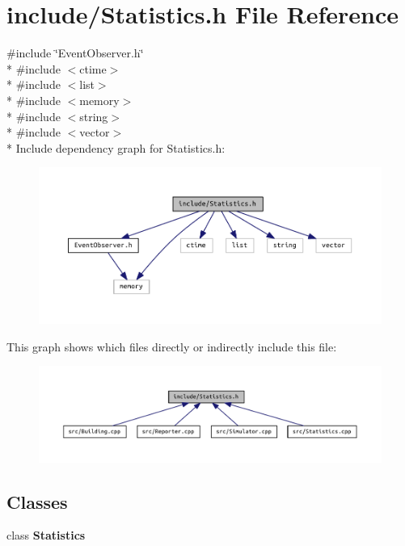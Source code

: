 \section{include/\+Statistics.h File Reference}
\label{_statistics_8h}
{\ttfamily \#include \char`\"{}Event\+Observer.\+h\char`\"{}}\\*
{\ttfamily \#include $<$ctime$>$}\\*
{\ttfamily \#include $<$list$>$}\\*
{\ttfamily \#include $<$memory$>$}\\*
{\ttfamily \#include $<$string$>$}\\*
{\ttfamily \#include $<$vector$>$}\\*
Include dependency graph for Statistics.\+h\+:
\nopagebreak
\begin{figure}[H]
\begin{center}
\leavevmode
\includegraphics[width=350pt]{_statistics_8h__incl}
\end{center}
\end{figure}
This graph shows which files directly or indirectly include this file\+:
\nopagebreak
\begin{figure}[H]
\begin{center}
\leavevmode
\includegraphics[width=350pt]{_statistics_8h__dep__incl}
\end{center}
\end{figure}
\subsection*{Classes}
\begin{DoxyCompactItemize}
\item 
class {\bf Statistics}
\end{DoxyCompactItemize}
